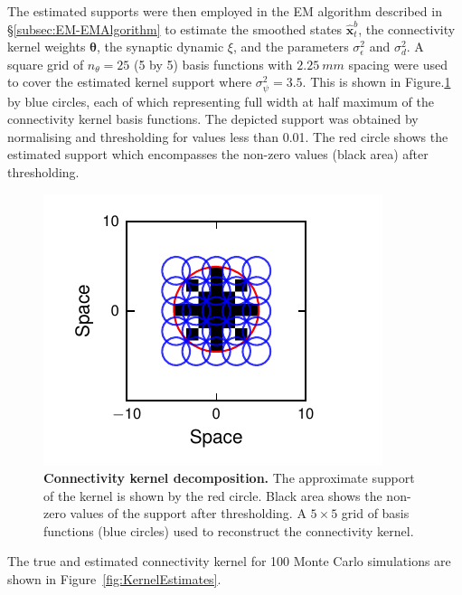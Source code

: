 \documentclass[]{article}
\begin{document}
The estimated supports were then employed in the EM algorithm described in \S\ref{subsec:EM-EMAlgorithm} to estimate the smoothed states $\hat{\mathbf x}_t^b$, the connectivity kernel weights $\boldsymbol\theta$, the synaptic dynamic $\xi$, and the parameters $\sigma_{\epsilon}^2$ and $\sigma^2_d$. A  square grid of $n_{\theta}=25$ (5 by 5) basis functions with $2.25~mm$ spacing were used to cover the estimated kernel support where $\sigma_{\psi}^2=3.5$. This is shown in Figure.\ref{fig:KernelWidthEstimation} by blue circles, each of which representing full width at half maximum of the connectivity kernel basis functions. The depicted support was obtained by normalising and thresholding for values less than 0.01.  The red circle shows the estimated support which encompasses the non-zero values (black area) after thresholding. 
\begin{figure}[!ht]
\begin{center}
\includegraphics{./Figures/KernelBasis1.pdf}
\end{center}
\caption{{\bf Connectivity kernel decomposition.} The approximate support of the kernel is shown by the red circle. Black area shows the non-zero values of the support after thresholding. A $5\times5$ grid of basis functions (blue circles) used to reconstruct the connectivity kernel.}
\label{fig:KernelWidthEstimation}
\end{figure}
 The true and estimated connectivity kernel for 100 Monte Carlo simulations are shown in Figure~\ref{fig:KernelEstimates}. 
\end{document}
